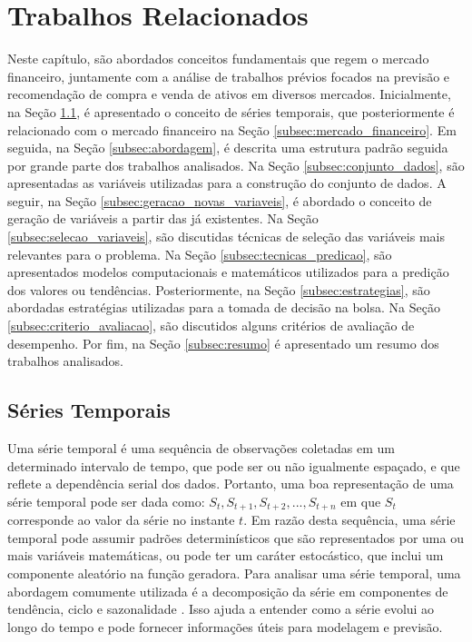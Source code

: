 \chapter{Trabalhos Relacionados}
\label{cap:trabalhos_relacionados}

Neste capítulo, são abordados conceitos fundamentais que regem o mercado financeiro, juntamente com a análise de trabalhos prévios focados na previsão e recomendação de compra e venda de ativos em diversos mercados. Inicialmente, na Seção \ref{subsec:series_temporais}, é apresentado o conceito de séries temporais, que posteriormente é relacionado com o mercado financeiro na Seção \ref{subsec:mercado_financeiro}. Em seguida, na Seção \ref{subsec:abordagem}, é descrita uma estrutura padrão seguida por grande parte dos trabalhos analisados. Na Seção \ref{subsec:conjunto_dados}, são apresentadas as variáveis utilizadas para a construção do conjunto de dados. A seguir, na Seção \ref{subsec:geracao_novas_variaveis}, é abordado o conceito de geração de variáveis a partir das já existentes. Na Seção \ref{subsec:selecao_variaveis}, são discutidas técnicas de seleção das variáveis mais relevantes para o problema. Na Seção \ref{subsec:tecnicas_predicao}, são apresentados modelos computacionais e matemáticos utilizados para a predição dos valores ou tendências. Posteriormente, na Seção \ref{subsec:estrategias}, são abordadas estratégias utilizadas para a tomada de decisão na bolsa. Na Seção \ref{subsec:criterio_avaliacao}, são discutidos alguns critérios de avaliação de desempenho. Por fim, na Seção \ref{subsec:resumo} é apresentado um resumo dos trabalhos analisados. 

\section{Séries Temporais}
\label{subsec:series_temporais}
Uma série temporal é uma sequência de observações coletadas em um determinado intervalo de tempo, que pode ser ou não igualmente espaçado, e que reflete a dependência serial dos dados. Portanto, uma boa representação de uma série temporal pode ser dada como: $S_t, S_{t+1}, S_{t+2}, ..., S_{t+n}$ em que $S_t$ corresponde ao valor da série no instante $t$. Em razão desta sequência, uma série temporal pode assumir padrões determinísticos que são representados por uma ou mais variáveis matemáticas, ou pode ter um caráter estocástico, que inclui um componente aleatório na função geradora. Para analisar uma série temporal, uma abordagem comumente utilizada é a decomposição da série em componentes de tendência, ciclo e sazonalidade \cite{Morettin_Modelling}. Isso ajuda a entender como a série evolui ao longo do tempo e pode fornecer informações úteis para modelagem e previsão.

